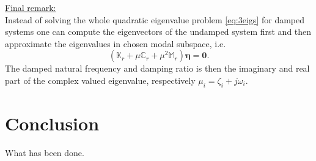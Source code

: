 \documentclass[conference]{journal}%
\newcommand{\bb}[1]{\mathbb{#1}}
\newcommand{\B}[1]{\mathbf{#1}}
\newcommand{\Beta}{\boldsymbol{\eta}}
\newcommand{\M}{\bb{M}}
\newcommand{\C}{\bb{C}}
\newcommand{\K}{\bb{K}}
\begin{document}
	\underline{Final remark:}\\ Instead of solving the whole quadratic eigenvalue problem \eqref{eq:3eigs} for damped systems one can compute the eigenvectors of the undamped system first and then approximate the eigenvalues in chosen modal subspace, i.e.
	\begin{equation}
	(\K_r + \mu \C_r + \mu^2 \M_r) \Beta = \B{0}.
	\end{equation}  
	The damped natural frequency and damping ratio is then the imaginary and real part of the complex valued eigenvalue, respectively $\mu_i = \zeta_i + j \omega_i$.
	
	\section{Conclusion}
	What has been done.
	
	
	
\end{document}
